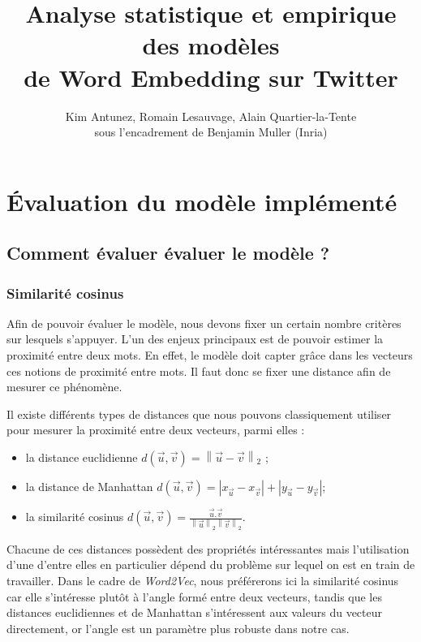 \documentclass[11pt,french,french]{article}
\title{Analyse statistique et empirique des modèles\\
de Word Embedding sur Twitter}
\author{Kim Antunez, Romain Lesauvage, Alain Quartier-la-Tente\\
sous l'encadrement de Benjamin Muller (Inria)}
\date{}
\begin{document}
\maketitle


\section{Évaluation du modèle
implémenté}\label{uxe9valuation-du-moduxe8le-impluxe9mentuxe9}

\subsection{Comment évaluer évaluer le modèle
?}\label{comment-uxe9valuer-uxe9valuer-le-moduxe8le}

\subsubsection{Similarité cosinus}\label{similarituxe9-cosinus}

Afin de pouvoir évaluer le modèle, nous devons fixer un certain nombre
critères sur lesquels s'appuyer. L'un des enjeux principaux est de
pouvoir estimer la proximité entre deux mots. En effet, le modèle doit
capter grâce dans les vecteurs ces notions de proximité entre mots. Il
faut donc se fixer une distance afin de mesurer ce phénomène.

Il existe différents types de distances que nous pouvons classiquement
utiliser pour mesurer la proximité entre deux vecteurs, parmi elles :

\begin{itemize}
\item la distance euclidienne $ d(\vec{u},\vec{v}) = \left\| \vec{u} - \vec{v}  \right\|_2$ ;
\item la distance de Manhattan $ d(\vec{u},\vec{v}) = |x_{\vec{u}} - x_{\vec{v}} | + |y_{\vec{u}} - y_{\vec{v}} |$;
\item la similarité cosinus $ d(\vec{u}, \vec{v}) = \frac{\vec{u}.\vec{v}}{\left\| \vec{u} \right\|_2  \left\| \vec{v} \right\|_2 }$.
\end{itemize}

Chacune de ces distances possèdent des propriétés intéressantes mais
l'utilisation d'une d'entre elles en particulier dépend du problème sur
lequel on est en train de travailler. Dans le cadre de \emph{Word2Vec},
nous préférerons ici la similarité cosinus car elle s'intéresse plutôt à
l'angle formé entre deux vecteurs, tandis que les distances euclidiennes
et de Manhattan s'intéressent aux valeurs du vecteur directement, or
l'angle est un paramètre plus robuste dans notre cas.
\end{document}
